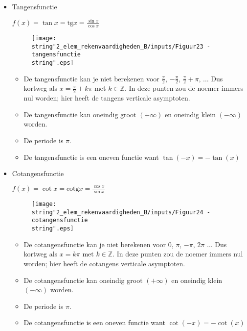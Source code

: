 \begin{itemize}
\item{Tangensfunctie}

${\displaystyle f(x)=\tan x=\textrm{tg}x=\frac{\sin x}{\cos x}}$

\noindent 
\begin{figure}[h]
	\centering{}\texttt{[image: \\string"2\_elem\_rekenvaardigheden\_B/inputs/Figuur23 - tangensfunctie\\string".eps]} 
\end{figure}

\begin{itemize}
	\item De tangensfunctie kan je niet berekenen voor $\frac{\pi}{2}$, $-\frac{\pi}{2}$,
	$\frac{\pi}{2}+\pi$, $\ldots$ Dus kortweg als $x=\frac{\pi}{2}+k\pi$
	met $k\in\mathbb{Z}$. In deze punten zou de noemer immers nul worden;
	hier heeft de tangens verticale asymptoten.
	\item De tangensfunctie kan oneindig groot $(+\infty)$ en oneindig klein
	$(-\infty)$ worden.
	\item De periode is $\pi$.
	\item De tangensfunctie is een oneven functie want $\tan(-x)=-\tan(x)$
\end{itemize}

\item{Cotangensfunctie}

${\displaystyle f(x)=\cot x=\textrm{cotg}x=\frac{\cos x}{\sin x}}$

\noindent 
\begin{figure}[h]
	\centering{}\texttt{[image: \\string"2\_elem\_rekenvaardigheden\_B/inputs/Figuur24 - cotangensfunctie\\string".eps]} 
\end{figure}

\begin{itemize}
	\item De cotangensfunctie kan je niet berekenen voor $0$, $\pi$, $-\pi$,
	$2\pi$ $\ldots$ Dus kortweg als $x=k\pi$ met $k\in\mathbb{Z}$.
	In deze punten zou de noemer immers nul worden; hier heeft de cotangens
	verticale asymptoten.
	\item De cotangensfunctie kan oneindig groot $(+\infty)$ en oneindig klein
	$(-\infty)$ worden.
	\item De periode is $\pi$.
	\item De cotangensfunctie is een oneven functie want $\cot(-x)=-\cot(x)$
\end{itemize}

\end{itemize}


